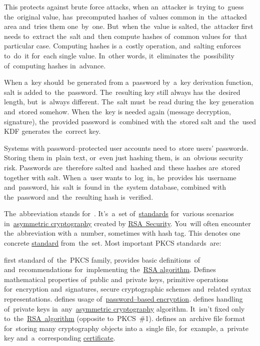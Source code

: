 This protects against brute force attacks, when an~attacker is~trying to~guess the~original value, has~precomputed hashes of~values common in~the~attacked area and~tries them one~by~one.
But~when the~value is salted, the~attacker first needs to~extract the~salt and~then compute hashes of~common values for~that particular case.
Computing hashes is a~costly operation, and~salting enforces to~do~it for~each single value.
In~other words, it~eliminates the~possibility of~computing hashes in~advance.

When a~key should~be generated from a~password by~a~key derivation function, salt is added to~the~password.
The~resulting key still always has the~desired length, but~is~always different.
The~salt must~be read during the~key generation and~stored somehow.
When the~key is needed again (message decryption, signature), the~provided password is~combined with the~stored salt and~the~used KDF generates the~correct key.

Systems with password--protected user accounts need to~store users' passwords.
Storing them in~plain text, or~even just hashing them, is~an~obvious security risk.
Passwords are~therefore salted and~hashed and~these hashes are~stored together with salt.
When a~user wants to~log~in, he~provides his~username and~password, his~salt is~found in~the~system database, combined with the~password and~the~resulting hash is~verified.

\label{pkcs}
The~abbreviation stands for~.
It's~a~set of~\hyperref[protocolstandard]{standards} for~various scenarios in~\hyperref[asymmetriccryptography]{asymmetric cryptography} created by \href{https://en.wikipedia.org/wiki/RSA_Security}{RSA~Security}.
You~will often encounter the~abbreviation with a~number, sometimes with hash tag.
This denotes one concrete \hyperref[protocolstandard]{standard} from~the~set.
Most important PKCS standards~are:
\begin{itemize}
     first standard of~the~PKCS family, provides basic definitions~of and~recommendations for~implementing the~\hyperref[rsa]{RSA algorithm}.
             Defines mathematical properties of~public and~private keys, primitive operations for~encryption and~signatures, secure cryptographic schemes and~related syntax representations.
     defines usage of~\hyperref[keypassword]{password--based encryption}.
     defines handling of~private keys in~any~\hyperref[asymmetriccryptography]{asymmetric cryptography} algorithm.
             It~isn't fixed only to~the~\hyperref[rsa]{RSA~algorithm} (opposite to~PKCS~\#1).
     defines an~archive file format for~storing many cryptography objects into a~single file, for~example, a~private key and~a~corresponding \hyperref[certificate]{certificate}.
\end{itemize}
